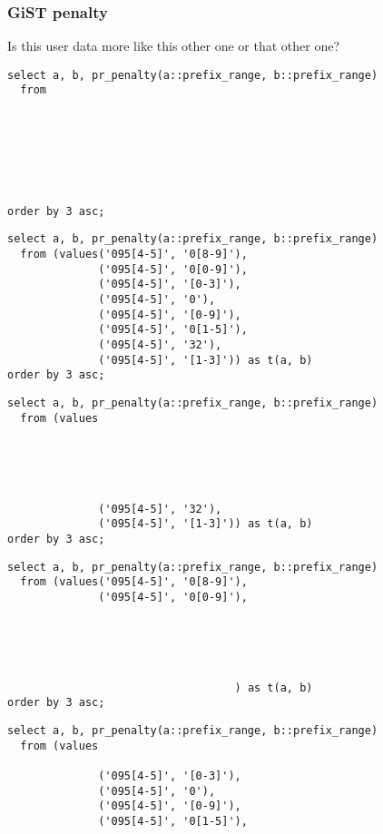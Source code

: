 \documentclass{beamer}
\begin{document}
\begin{frame}[fragile]
  \frametitle{GiST penalty}

  Is this user data more like this other one or that other one?

  \begin{example}
  \begin{overprint}

  \begin{verbatim}
select a, b, pr_penalty(a::prefix_range, b::prefix_range)
  from
      
      
      
      
      
      
      
order by 3 asc;
  \end{verbatim}

  \begin{verbatim}
select a, b, pr_penalty(a::prefix_range, b::prefix_range)
  from (values('095[4-5]', '0[8-9]'),
              ('095[4-5]', '0[0-9]'),
              ('095[4-5]', '[0-3]'),
              ('095[4-5]', '0'),
              ('095[4-5]', '[0-9]'),
              ('095[4-5]', '0[1-5]'),
              ('095[4-5]', '32'),
              ('095[4-5]', '[1-3]')) as t(a, b)
order by 3 asc;
  \end{verbatim}

  \begin{verbatim}
select a, b, pr_penalty(a::prefix_range, b::prefix_range)
  from (values





              ('095[4-5]', '32'),
              ('095[4-5]', '[1-3]')) as t(a, b)
order by 3 asc;
  \end{verbatim}

  \begin{verbatim}
select a, b, pr_penalty(a::prefix_range, b::prefix_range)
  from (values('095[4-5]', '0[8-9]'),
              ('095[4-5]', '0[0-9]'),





                                   ) as t(a, b)
order by 3 asc;
  \end{verbatim}

  \begin{verbatim}
select a, b, pr_penalty(a::prefix_range, b::prefix_range)
  from (values
              
              ('095[4-5]', '[0-3]'),
              ('095[4-5]', '0'),
              ('095[4-5]', '[0-9]'),
              ('095[4-5]', '0[1-5]'),
              

\end{verbatim}
\end{overprint}
\end{example}
\end{frame}
\end{document}
